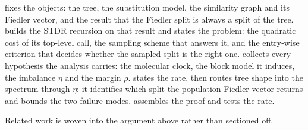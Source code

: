  fixes the objects: the tree, the substitution model, the similarity graph
and its Fiedler vector, and the result that the Fiedler split is always a split of the tree.
 builds the STDR recursion on that result and states the problem:
the quadratic cost of its top-level call, the sampling scheme that answers it, and the entry-wise
criterion that decides whether the sampled split is the right one.  collects every hypothesis the
analysis carries: the molecular clock, the block model it induces, the imbalance $\eta$ and the
margin $\rho$.  states the rate.  then routes tree shape into
the spectrum through $\eta$: it identifies which split the population Fiedler vector returns and
bounds the two failure modes.  assembles the proof and 
tests the rate.

Related work is woven into the argument above rather than sectioned off.
